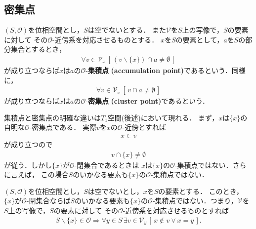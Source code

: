 \subsection{密集点}
	\begin{screen}
		\begin{dfn}
			$(S,\mathscr{O})$を位相空間とし，$S$は空でないとする．
			また$\mathcal{V}$を$S$上の写像で，$S$の要素に対して
			その$\mathscr{O}$-近傍系を対応させるものとする．
			$x$を$S$の要素として，$a$を$S$の部分集合とするとき，
			\begin{align}
				\forall v \in \mathcal{V}_{x}\, \left[\, (v \backslash \{x\}) \cap a \neq \emptyset\, \right]
			\end{align}
			が成り立つならば$x$は$a$の$\mathscr{O}$-{\bf 集積点}
			{\bf (accumulation point)}であるという．同様に，
			\begin{align}
				\forall v \in \mathcal{V}_{x}\, \left[\, v \cap a \neq \emptyset\, \right]
			\end{align}
			が成り立つならば$x$は$a$の$\mathscr{O}$-{\bf 密集点}
			{\bf (cluster point)}であるという．
		\end{dfn}
	\end{screen}
	
	集積点と密集点の明確な違いは$T_1$空間(後述)において現れる．
	まず，$x$は$\{x\}$の自明な$\mathscr{O}$-密集点である．
	実際$v$を$x$の$\mathscr{O}$-近傍とすれば
	\begin{align}
		x \in v
	\end{align}
	が成り立つので
	\begin{align}
		v \cap \{x\} \neq \emptyset
	\end{align}
	が従う．しかし$\{x\}$が$\mathscr{O}$-閉集合であるときは
	$x$は$\{x\}$の$\mathscr{O}$-集積点ではない．さらに言えば，
	この場合$S$のいかなる要素も$\{x\}$の$\mathscr{O}$-集積点ではない．
	
	\begin{screen}
		\begin{thm}[閉である一点集合は集積点を持たない]
		\label{thm:closed_singleton_has_no_accumulation_point}
			$(S,\mathscr{O})$を位相空間とし，$S$は空でないとし，$x$を$S$の要素とする．
			このとき，$\{x\}$が$\mathscr{O}$-閉集合ならば$S$のいかなる要素も$\{x\}$の$\mathscr{O}$-集積点ではない．つまり，$\mathcal{V}$を$S$上の写像で，$S$の要素に対して
			その$\mathscr{O}$-近傍系を対応させるものとすれば
			\begin{align}
				S \backslash \{x\} \in \mathscr{O} \Longrightarrow
				\forall y \in S\, \exists v \in \mathcal{V}_{y}\, 
				\left[\, x \notin v \vee x = y\, \right].
			\end{align}
		\end{thm}
	\end{screen}
	
